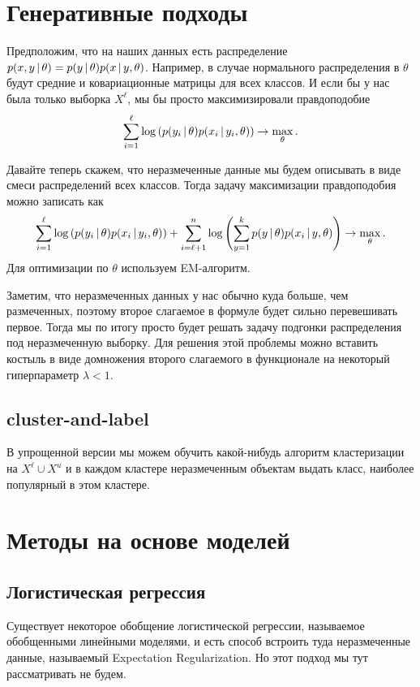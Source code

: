 \documentclass[12pt,fleqn]{article}
\begin{document}
\section{Генеративные подходы}

Предположим, что на наших данных есть распределение $p(x, y \mspace{3mu}{|}\mspace{3mu} \theta) = p(y \mspace{3mu}{|}\mspace{3mu} \theta)p(x \mspace{3mu}{|}\mspace{3mu} y, \theta)$. Например, в случае нормального распределения в $\theta$ будут средние и ковариационные матрицы для всех классов. И если бы у нас была только выборка $X^\ell$, мы бы просто максимизировали правдоподобие
\[
    \sum\limits_{i = 1}^{\ell} \log \left(p(y_i \mspace{3mu}{|}\mspace{3mu} \theta)p(x_i \mspace{3mu}{|}\mspace{3mu} y_i, \theta)\right) \to \max_\theta.
\]

Давайте теперь скажем, что неразмеченные данные мы будем описывать в виде смеси распределений всех классов. Тогда задачу максимизации правдоподобия можно записать как
\[
    \sum\limits_{i = 1}^{\ell} \log \left(p(y_i \mspace{3mu}{|}\mspace{3mu} \theta)p(x_i \mspace{3mu}{|}\mspace{3mu} y_i, \theta)\right) + \sum\limits_{i = \ell + 1}^{n} \log \left(\sum\limits_{y = 1}^k p(y \mspace{3mu}{|}\mspace{3mu} \theta) p(x_i \mspace{3mu}{|}\mspace{3mu} y, \theta)\right) \to \max_\theta.
\]
Для оптимизации по $\theta$ используем EM-алгоритм.

Заметим, что неразмеченных данных у нас обычно куда больше, чем размеченных, поэтому второе слагаемое в формуле будет сильно перевешивать первое. Тогда мы по итогу просто будет решать задачу подгонки распределения под неразмеченную выборку. Для решения этой проблемы можно вставить костыль в виде домножения второго слагаемого в функционале на некоторый гиперпараметр $\lambda < 1$.

\subsection{cluster-and-label}

В упрощенной версии мы можем обучить какой-нибудь алгоритм кластеризации на $X^\ell \cup X^u$ и в каждом кластере неразмеченным объектам выдать класс, наиболее популярный в этом кластере. 

\section{Методы на основе моделей}

\subsection{Логистическая регрессия}

Существует некоторое обобщение логистической регрессии, называемое обобщенными линейными моделями, и есть способ встроить туда неразмеченные данные, называемый Expectation Regularization. Но этот подход мы тут рассматривать не будем.
\end{document}
